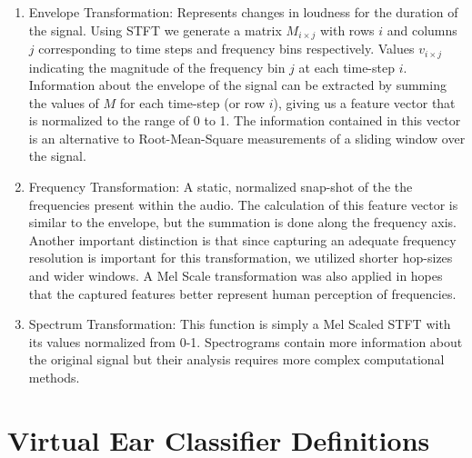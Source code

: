 \documentclass[runningheads,a4paper]{llncs}
\begin{document}
\begin{appendices}
\begin{figure}[tbp]
\label{fig:stackspectrums}
\end{figure}
\begin{enumerate}
\item Envelope Transformation: Represents changes in loudness for the duration of the signal. Using STFT we generate a matrix $M_{i \times j}$ with rows $i$ and columns $j$ corresponding to time steps and frequency bins respectively. Values $v_{i \times j}$ indicating the magnitude of the frequency bin $j$ at each time-step $i$. Information about the envelope of the signal can be extracted by summing the values of $M$ for each time-step (or row $i$), giving us a feature vector that is normalized to the range of 0 to 1. The information contained in this vector is an alternative to Root-Mean-Square measurements of a sliding window over the signal.
\item Frequency Transformation: A static, normalized snap-shot of the the frequencies present within the audio. The calculation of this feature vector is similar to the envelope, but the summation is done along the frequency axis. Another important distinction is that since capturing an adequate frequency resolution is important for this transformation, we utilized shorter hop-sizes and wider windows. A Mel Scale transformation was also applied in hopes that the captured features better represent human perception of frequencies. 
\item Spectrum Transformation: This function is simply a Mel Scaled STFT with its values normalized from 0-1. Spectrograms contain more information about the original signal but their analysis requires more complex computational methods.
\end{enumerate}

\chapter{Virtual Ear Classifier Definitions}
\label{appendix:classifier_definitions}

\end{appendices}
\end{document}
